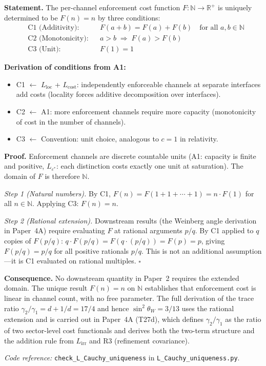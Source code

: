 \documentclass[11pt]{article}
\newenvironment{varlist}{\begin{itemize}[nosep,leftmargin=2em]}{\end{itemize}}
\newcommand{\coderef}[2]{\smallskip\noindent\textit{Code reference:} \texttt{#1} in \texttt{#2}.}
\begin{document}
\begin{tcolorbox}[apfbox, title={Lemma $L_{\mathrm{Cauchy}}$ (Cost Function Uniqueness)}]
\textbf{Statement.}  The per-channel enforcement cost function $F: \mathbb{N} \to \mathbb{R}^+$ is uniquely determined to be $F(n) = n$ by three conditions:
\begin{align}
&\text{C1 (Additivity):} &&F(a + b) = F(a) + F(b) \quad \text{for all } a, b \in \mathbb{N} \label{eq:C1}\\
&\text{C2 (Monotonicity):} &&a > b \;\Rightarrow\; F(a) > F(b) \label{eq:C2}\\
&\text{C3 (Unit):} &&F(1) = 1 \label{eq:C3}
\end{align}

\smallskip\noindent\textbf{Derivation of conditions from A1:}
\begin{varlist}
\item C1 $\leftarrow$ $L_{\mathrm{loc}}$ + $L_{\mathrm{cost}}$: independently enforceable channels at separate interfaces add costs (locality forces additive decomposition over interfaces).
\item C2 $\leftarrow$ A1: more enforcement channels require more capacity (monotonicity of cost in the number of channels).
\item C3 $\leftarrow$ Convention: unit choice, analogous to $c = 1$ in relativity.
\end{varlist}

\smallskip\noindent\textbf{Proof.}  Enforcement channels are discrete countable units (A1: capacity is finite and positive, $L_{\varepsilon^*}$: each distinction costs exactly one unit at saturation).  The domain of $F$ is therefore $\mathbb{N}$.

\textit{Step 1 (Natural numbers).}  By C1, $F(n) = F(1 + 1 + \cdots + 1) = n \cdot F(1)$ for all $n \in \mathbb{N}$.  Applying C3: $F(n) = n$.

\textit{Step 2 (Rational extension).}  Downstream results (the Weinberg angle derivation in Paper~4A) require evaluating $F$ at rational arguments $p/q$.  By C1 applied to $q$ copies of $F(p/q)$: $q \cdot F(p/q) = F(q \cdot (p/q)) = F(p) = p$, giving $F(p/q) = p/q$ for all positive rationals $p/q$.  This is not an additional assumption---it is C1 evaluated on rational multiples.  $\square$

\smallskip\noindent\textbf{Consequence.}  No downstream quantity in Paper~2 requires the extended domain.  The unique result $F(n) = n$ on $\mathbb{N}$ establishes that enforcement cost is linear in channel count, with no free parameter.  The full derivation of the trace ratio $\gamma_2/\gamma_1 = d + 1/d = 17/4$ and hence $\sin^2\theta_W = 3/13$ uses the rational extension and is carried out in Paper~4A (T27d), which defines $\gamma_2/\gamma_1$ as the ratio of two sector-level cost functionals and derives both the two-term structure and the addition rule from $L_{\mathrm{irr}}$ and R3 (refinement covariance).

\coderef{check\_L\_Cauchy\_uniqueness}{L\_Cauchy\_uniqueness.py}
\end{tcolorbox}
\end{document}
